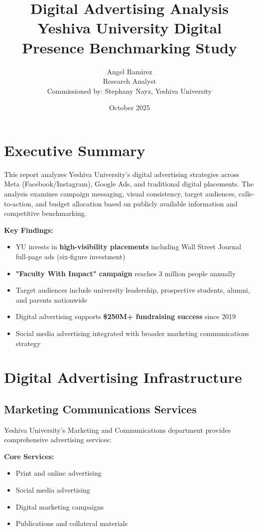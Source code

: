 \documentclass[12pt,letterpaper]{article}
\title{\textbf{Digital Advertising Analysis}\\
\large Yeshiva University Digital Presence Benchmarking Study}
\author{Angel Ramirez\\
\small Research Analyst\\
\small Commissioned by: Stephany Nayz, Yeshiva University}
\date{October 2025}
\begin{document}
\maketitle

\section*{Executive Summary}

This report analyzes Yeshiva University's digital advertising strategies across Meta (Facebook/Instagram), Google Ads, and traditional digital placements. The analysis examines campaign messaging, visual consistency, target audiences, calls-to-action, and budget allocation based on publicly available information and competitive benchmarking.

\textbf{Key Findings:}
\begin{itemize}[leftmargin=*]
    \item YU invests in \textbf{high-visibility placements} including Wall Street Journal full-page ads (six-figure investment)
    \item \textbf{"Faculty With Impact" campaign} reaches 3 million people annually
    \item Target audiences include university leadership, prospective students, alumni, and parents nationwide
    \item Digital advertising supports \textbf{\$250M+ fundraising success} since 2019
    \item Social media advertising integrated with broader marketing communications strategy
\end{itemize}

\section{Digital Advertising Infrastructure}

\subsection{Marketing Communications Services}

Yeshiva University's Marketing and Communications department provides comprehensive advertising services:

\textbf{Core Services:}
\begin{itemize}[leftmargin=*]
    \item Print and online advertising
    \item Social media advertising
    \item Digital marketing campaigns
    \item Publications and collateral materials
\end{itemize}
\end{document}
